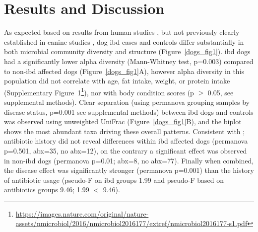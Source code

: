 \section{Results and Discussion}

As expected based on results from human studies \cite{RN3999, RN154}, but not previously clearly established in canine studies \cite{RN153, RN17138}, dog \gls{ibd} cases and controls differ substantially in both microbial community diversity and structure (Figure~\ref{dogs_fig1}). \gls{ibd} dogs had a significantly lower alpha diversity (Mann-Whitney test, p=0.003) compared to non-\gls{ibd} affected dogs (Figure~\ref{dogs_fig1}A), however alpha diversity in this population did not correlate with age, fat intake, weight, or protein intake (Supplementary Figure~1\footnote{\url{https://images.nature.com/original/nature-assets/nmicrobiol/2016/nmicrobiol2016177/extref/nmicrobiol2016177-s1.pdf}}), nor with body condition scores (p $>$ 0.05, see supplemental methods). Clear separation (using \gls{permanova} grouping samples by disease status, p=0.001 see supplemental methods) between \gls{ibd} dogs and controls was observed using unweighted UniFrac (Figure~\ref{dogs_fig1}B), and the biplot shows the most abundant taxa driving these overall patterns. Consistent with \cite{RN153}; antibiotic history did not reveal differences within \gls{ibd} affected dogs (\gls{permanova} p=0.501, abx=35, no abx=12), on the contrary a significant effect was observed in non-\gls{ibd} dogs (\gls{permanova} p=0.01; abx=8, no abx=77). Finally when combined, the disease effect was significantly stronger (\gls{permanova} p=0.001) than the history of antibiotic usage (pseudo-F on \gls{ibd} groups 1.99 and pseudo-F based on antibiotics groups 9.46; 1.99 $<$ 9.46).

